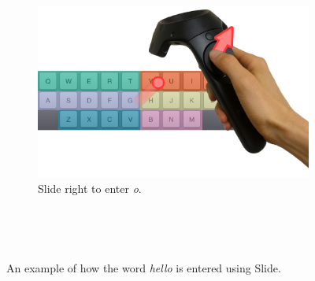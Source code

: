 \begin{figure}
  \begin{subfigure}{.6\columnwidth}
  \includegraphics[width=\textwidth]{figures/upperRight}
  \caption{Slide right to enter \textit{o}. }
  \label{fig:controllerVive}
  \end{subfigure}
  \\

  \caption{An example of how the word \textit{hello} is entered using Slide.
  }
~\label{fig:example}

\end{figure}

